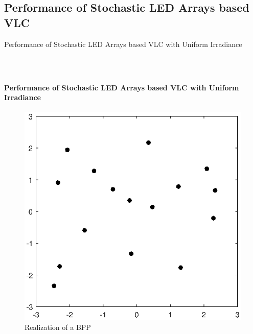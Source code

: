 \documentclass{beamer}
\theoremstyle{remark}
\begin{document}
\subsection{Performance of Stochastic LED Arrays based VLC}
\begin{frame}
\vfill
Performance of Stochastic LED Arrays based VLC with Uniform Irradiance
\vfill
\end{frame}
\begin{frame}
\frametitle{\,}
\framesubtitle{Performance of Stochastic LED Arrays based VLC with Uniform Irradiance}
   \begin{figure}
        \centering
        \includegraphics[width=.6\framewidth]{LedArrangementRandom}
        \caption{Realization of a BPP}
        \end{figure}
\end{frame}
\end{document}
